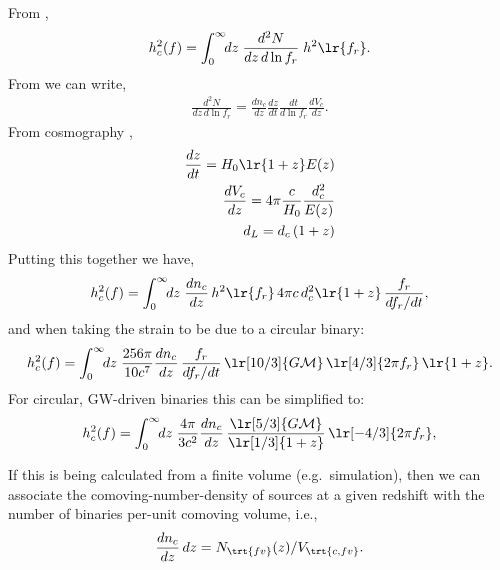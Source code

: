 \documentclass[10pt, oneside, onecolumn]{article}   	%
\begin{document}
            From \citet[][Eq.~10]{sesana2008},
            \begin{align}
                h_c^2(f) = \int_0^\infty \!\! dz \; \frac{d^2 N}{dz \, d\ln f_r} \; h^2\lr{f_r}.
            \end{align}
            From \citet[][Eq.~6]{sesana2008} we can write,
            \begin{align}
                \frac{d^2 N}{dz \, d\ln f_r} = \frac{d n_c}{dz} \frac{dz}{dt} \frac{dt}{d\ln f_r} \frac{d V_c}{dz}.
            \end{align}
            From cosmography \citep[e.g.][]{Hogg1999},
            \begin{subequations}
            \begin{align}
                \frac{dz}{dt} = H_0 \lr{1+z} E(z) \\
                \frac{d V_c}{dz} = 4\pi \frac{c}{H_0} \frac{d_c^2}{E(z)} \\
                d_L = d_c \, (1+z)
            \end{align}
            \end{subequations}
            Putting this together we have,
            \begin{equation}
                h_c^2(f) = \int_0^\infty \!\! dz \; \frac{dn_c}{dz} \, h^2\lr{f_r} \, 4\pi c \, d_c^2 \lr{1+z} \, \frac{f_r}{df_r / dt},
            \end{equation}
            and when taking the strain to be due to a circular binary:
            \begin{equation}
                h_c^2(f) = \int_0^\infty \!\! dz \; \frac{256 \pi}{10 c^7} \frac{dn_c}{dz} \, \frac{f_r}{df_r / dt} \, \lr[10/3]{G \mathcal{M}} \, \lr[4/3]{2\pi f_r} \, \lr{1+z}.
            \end{equation}
            For circular, GW-driven binaries this can be simplified to:
            \begin{equation}
                h_c^2(f) = \int_0^\infty \!\! dz \; \frac{4 \pi}{3 c^2} \frac{dn_c}{dz}  \, \frac{\lr[5/3]{G \mathcal{M}}}{\lr[1/3]{1+z}} \, \lr[-4/3]{2\pi f_r},
            \end{equation}

            If this is being calculated from a finite volume (e.g.~simulation), then we can associate the comoving-number-density of sources at a given redshift with the number of binaries per-unit comoving volume, i.e.,
            \begin{align}
                \frac{dn_c}{dz} \, dz = N_\trt{fv}(z)/V_\trt{c,fv}.
            \end{align}
\end{document}
